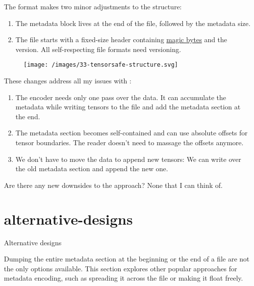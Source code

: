 \documentclass{article}
\begin{document}
The format makes two minor adjustments to the  structure:
\begin{enumerate}
\item The metadata block lives at the end of the file, followed by the metadata size.
\item The file starts with a fixed-size header containing \href{https://en.wikipedia.org/wiki/Magic_number_(programming)#In_files}{magic bytes} and the version.
  All self-respecting file formats need versioning.
\end{enumerate}
\newline

\begin{figure}[grayscale-diagram]
  \texttt{[image: /images/33-tensorsafe-structure.svg]}
\end{figure}

These changes address all my issues with :
\begin{enumerate}
\item The encoder needs only one pass over the data.
  It can accumulate the metadata while writing tensors to the file and add the metadata section at the end.
\item
  The metadata section becomes self-contained and can use absolute offsets for tensor boundaries.
  The reader doesn't need to massage the offsets anymore.
\item
  We don't have to move the data to append new tensors:
  We can write over the old metadata section and append the new one.
\end{enumerate}

Are there any new downsides to the  approach?
None that I can think of.

\section{alternative-designs}{Alternative designs}

Dumping the entire metadata section at the beginning or the end of a file are not the only options available.
This section explores other popular approaches for metadata encoding,
such as spreading it across the file or making it float freely.
\end{document}
